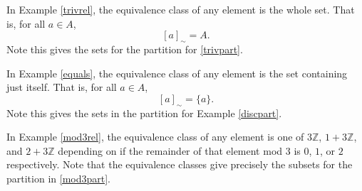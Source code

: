 \documentclass{amsart}
\begin{document}
\begin{example}\label{trivclasses}
	In Example \ref{trivrel}, the equivalence class of any element is the whole
	set. That is, for all \(a\in A\), 
	\[
		[a]_\sim = A.
	\]
	Note this gives the sets for the partition for \ref{trivpart}.
\end{example}

\begin{example}\label{discclasses}
	In Example \ref{equals}, the equivalence class of any element is the set
	containing just itself. That is, for all \(a\in A\), 
	\[
		[a]_\sim = \{a\}.
	\]
	Note this gives the sets in the partition for Example \ref{discpart}.
\end{example}

\begin{example}\label{mod3classes}
	In Example \ref{mod3rel}, the equivalence class of any element is one of
	\(3\mathbb{Z}\), \(1 + 3\mathbb{Z}\), and \(2 + 3\mathbb{Z}\) depending on
	if the remainder of that element mod 3 is \(0\), \(1\), or \(2\)
	respectively. Note that the equivalence classes
	give precisely the subsets for the partition in \ref{mod3part}. 
\end{example}
\end{document}
